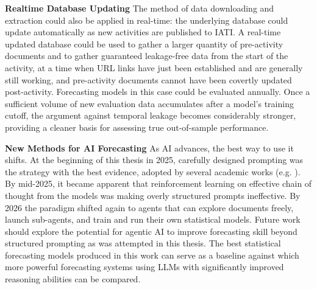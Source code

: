 \documentclass[12pt,a4paper]{article}
\let\citep\parencite
\begin{document}
\textbf{Realtime Database Updating}
The method of data downloading and extraction could also be applied in real-time: the underlying database could update automatically as new activities are published to IATI. A real-time updated database could be used to gather a larger quantity of pre-activity documents and to gather guaranteed leakage-free data from the start of the activity, at a time when URL links have just been established and are generally still working, and pre-activity documents cannot have been covertly updated post-activity. Forecasting models in this case could be evaluated annually. Once a sufficient volume of new evaluation data accumulates after a model's training cutoff, the argument against temporal leakage becomes considerably stronger, providing a cleaner basis for assessing true out-of-sample performance.

\textbf{New Methods for AI Forecasting}
As AI advances, the best way to use it shifts. At the beginning of this thesis in 2025, carefully designed prompting was the strategy with the best evidence, adopted by several academic works (e.g. \citep{halawiApproachingHumanLevelForecasting2024} \citep{kaiserLeveragingLLMsPredictive2025}). By mid-2025, it became apparent that reinforcement learning on effective chain of thought from the models was making overly structured prompts ineffective. By 2026 the paradigm shifted again to agents that can explore documents freely, launch sub-agents, and train and run their own statistical models. Future work should explore the potential for agentic AI to improve forecasting skill beyond structured prompting as was attempted in this thesis. The best statistical forecasting models produced in this work can serve as a baseline against which more powerful forecasting systems using LLMs with significantly improved reasoning abilities can be compared.
\end{document}

